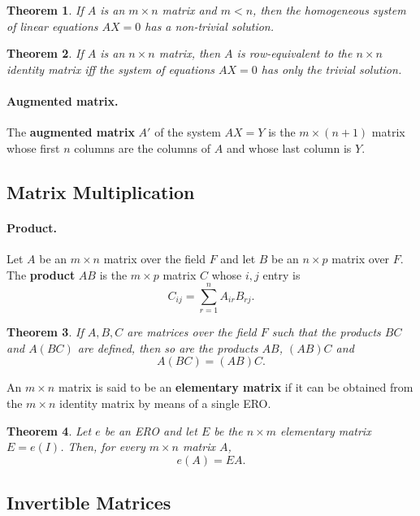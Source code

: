 \documentclass{article}
\newtheorem{theorem}{Theorem}
\begin{document}
\begin{theorem}
  If $A$ is an $m \times n$ matrix and $m < n$, then the homogeneous system of
  linear equations $AX = 0$ has a non-trivial solution.
\end{theorem}

\begin{theorem}
  If $A$ is an $n \times n$ matrix, then $A$ is row-equivalent to the $n \times
  n$ identity matrix iff the system of equations $AX = 0$ has only
  the trivial solution.
\end{theorem}

\paragraph{Augmented matrix.} The \textbf{augmented matrix} $A'$ of the system
$AX = Y$ is the $m \times (n + 1)$ matrix whose first $n$ columns are the
columns of $A$ and whose last column is $Y$.

\subsection{Matrix Multiplication}

\paragraph{Product.} Let $A$ be an $m \times n$ matrix over the field $F$ and
let $B$ be an $n \times p$ matrix over $F$. The \textbf{product} $AB$ is the $m
\times p$ matrix $C$ whose $i, j$ entry is \[
  C_{ij} = \sum_{r=1}^n A_{ir}B_{rj}.
\]

\begin{theorem}
  If $A, B, C$ are matrices over the field $F$ such that the products $BC$ and
  $A(BC)$ are defined, then so are the products $AB$, $(AB)C$ and \[
    A(BC) = (AB)C.
  \]
\end{theorem}

An $m \times n$ matrix is said to be an \textbf{elementary matrix} if it can be
obtained from the $m \times n$ identity matrix by means of a single ERO.

\begin{theorem}
  Let $e$ be an ERO and let $E$ be the $n \times m$ elementary matrix $E =
  e(I)$. Then, for every $m \times n$ matrix $A$, \[
    e(A) = EA.
  \]
\end{theorem}

\subsection{Invertible Matrices}
\end{document}
